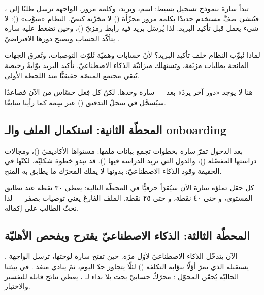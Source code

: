 تبدأ سارة بنموذج تسجيل بسيط: اسم، وبريد، وكلمة مرور. الواجهة ترسل طلبًا إلى
، فيُنشئ  صفَّ مستخدم جديدًا بكلمة مرور
مجزّأة () لا مخزّنة كنصّ. النظام «مبوَّب» (): لا شيء يعمل قبل
تأكيد البريد. لذا يُرسَل بريد فيه رابط رمزيّ ()، وحين تضغط عليه سارة
يتأكّد الحساب ويصبح دورها الافتراضيّ .

\begin{why}
لماذا نُبوِّب النظام خلف تأكيد البريد؟ لأنّ حسابات وهميّة تُلوّث التوصيات، وتُغرق
الجهات المانحة بطلبات مزيّفة، وتستهلك ميزانيّة الذكاء الاصطناعيّ. تأكيد البريد
بوّابةٌ رخيصة تُبقي مجتمع المنصّة حقيقيًّا منذ اللحظة الأولى.
\end{why}

\begin{note}
هنا لا يوجد «دور آخر يردّ» بعد — سارة وحدها. لكنّ كل فِعل حسّاس من الآن فصاعدًا
سيُسجَّل في سجلّ التدقيق () عبر سِمة \code{[Auditable]} كما رأينا سابقًا.
\end{note}

\subsection{المحطّة الثانية: استكمال الملف والـ onboarding}

بعد الدخول تمرّ سارة بخطوات  تجمع بيانات ملفها: مستواها الأكاديميّ
()، ومجالات دراستها المفضّلة ()، والدول التي
تريد الدراسة فيها (). قد تبدو خطوة شكليّة، لكنّها في الحقيقة
وقود الذكاء الاصطناعيّ: بدونها لا يملك المحرّك ما يطابق به المنح.

\begin{keyp}
كل حقل تملؤه سارة الآن سيُقرَأ حرفيًّا في المحطّة التالية:  يعطي
٣٠ نقطة عند تطابق المستوى، و حتى ٤٠ نقطة، و
حتى ٢٥ نقطة. الملف الفارغ يعني توصيات بصفر — لذا نحثّ الطالب على إكماله.
\end{keyp}

\subsection{المحطّة الثالثة: الذكاء الاصطناعيّ يقترح ويفحص الأهليّة}

الآن يتدخّل الذكاء الاصطناعيّ لأوّل مرّة. حين تفتح سارة لوحتها، ترسل الواجهة
. يستقبله 
الذي يمرّ أوّلًا ببوّابة التكلفة () لئلّا يتجاوز حدّ اليوم، ثمّ
ينادي منفذ . في بيئتنا الحاليّة يُحقَن المحوّل :
محرّكٌ حسابيّ بحت بلا نداء لـ ، يعطي نتائج قابلة للتفسير والاختبار.

